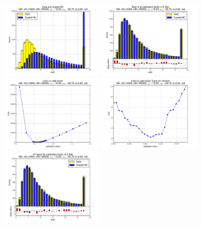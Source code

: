 
 \begin{figure}[htbp] \begin{center} 
\includegraphics[width=0.45\textwidth]{../FIGURES/166/FIG_Data_and_scaled_MC.pdf} 
\includegraphics[width=0.45\textwidth]{../FIGURES/166/FIG_Best_fit_at_calibration_factor_of_0_562.pdf} 
\includegraphics[width=0.45\textwidth]{../FIGURES/166/FIG_Chi2_vs_calib_factor.pdf} 
\includegraphics[width=0.45\textwidth]{../FIGURES/166/FIG_Chi2_vs_calib_factor_Zoom_on_chi2min.pdf} 
\includegraphics[width=0.45\textwidth]{../FIGURES/166/FIG_Fit_result_for_calibration_factor_of_0_556.pdf} 

\end{center}
\end{figure}
